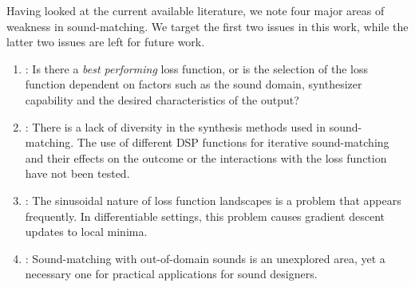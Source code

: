 Having looked at the current available literature, we note four major areas of weakness in sound-matching. We target the first two issues in this work, while the latter two issues are left for future work.
\begin{enumerate}
    \item \LossSelect: Is there a \textit{best performing} loss function, or is the selection of the loss function dependent on factors such as the sound domain, synthesizer capability and the desired characteristics of the output? 
    \item \SynthSelect: There is a lack of diversity in the synthesis methods used in sound-matching. The use of different DSP functions for iterative sound-matching and their effects on the outcome or the interactions with the loss function have not been tested.
    \item \PeriodicLoss: The sinusoidal nature of loss function landscapes is a problem that appears frequently. In differentiable settings, this problem causes gradient descent updates to local minima. 
    \item \OutDomain: Sound-matching with out-of-domain sounds is an unexplored area, yet a necessary one for practical applications for sound designers.
\end{enumerate}





